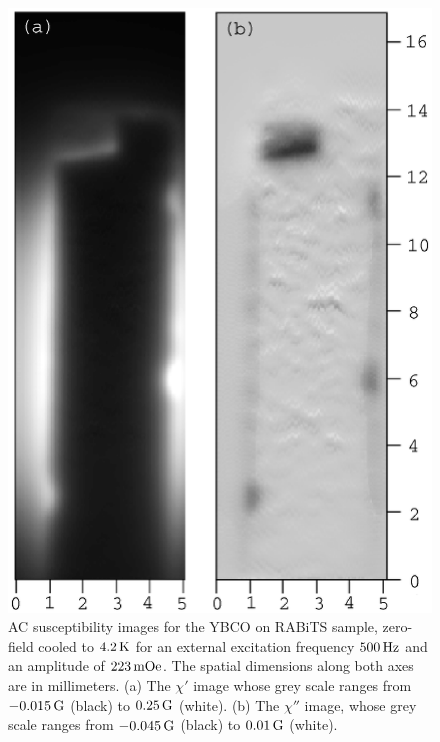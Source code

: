 %
%
\begin{figure}[p]
\includegraphics{figs/magpen/fig5r3b.ps}
\caption[YBCO on RABiTS AC susceptibility images at $500\,\kHz$.]
{AC susceptibility images for the YBCO on RABiTS sample, 
zero-field cooled to $4.2\,\kelvin$ for an external excitation frequency  
$500\,\Hz$ and
an amplitude of $223\,\mOe$. The spatial dimensions along both 
axes are in millimeters. 
(a) The $\chi'$ image whose grey scale ranges from
$-0.015\,\Gauss$ (black) to $0.25\,\Gauss$ (white).
(b)  The $\chi''$ image, whose grey scale ranges from
$-0.045\,\Gauss$ (black) to $0.01\,\Gauss$ (white). 
}
\label{fig:rabits_ac_images_b}
\end{figure}

